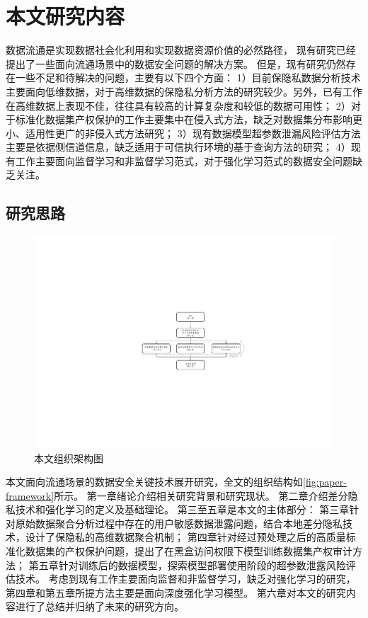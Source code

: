 \section{本文研究内容}
数据流通是实现数据社会化利用和实现数据资源价值的必然路径，
现有研究已经提出了一些面向流通场景中的数据安全问题的解决方案。
但是，现有研究仍然存在一些不足和待解决的问题，主要有以下四个方面：
1）目前保隐私数据分析技术主要面向低维数据，对于高维数据的保隐私分析方法的研究较少。另外，已有工作在高维数据上表现不佳，往往具有较高的计算复杂度和较低的数据可用性；
2）对于标准化数据集产权保护的工作主要集中在侵入式方法，缺乏对数据集分布影响更小、适用性更广的非侵入式方法研究；
3）现有数据模型超参数泄漏风险评估方法主要是依据侧信道信息，缺乏适用于可信执行环境的基于查询方法的研究；
4）现有工作主要面向监督学习和非监督学习范式，对于强化学习范式的数据安全问题缺乏关注。

\subsection{研究思路}
\begin{figure}[h]
    \centering
    \includegraphics[width=0.75\hsize]{figure/others/全文框架5.pdf}
    \caption{本文组织架构图} 
    \label{fig:paper-framework}
\end{figure}
本文面向流通场景的数据安全关键技术展开研究，全文的组织结构如\autoref{fig:paper-framework}所示。
第一章绪论介绍相关研究背景和研究现状。
第二章介绍差分隐私技术和强化学习的定义及基础理论。
第三至五章是本文的主体部分：
第三章针对原始数据聚合分析过程中存在的用户敏感数据泄露问题，结合本地差分隐私技术，设计了保隐私的高维数据聚合机制；
第四章针对经过预处理之后的高质量标准化数据集的产权保护问题，提出了在黑盒访问权限下模型训练数据集产权审计方法；
第五章针对训练后的数据模型，探索模型部署使用阶段的超参数泄露风险评估技术。
考虑到现有工作主要面向监督和非监督学习，缺乏对强化学习的研究，第四章和第五章所提方法主要是面向深度强化学习模型。
第六章对本文的研究内容进行了总结并归纳了未来的研究方向。


